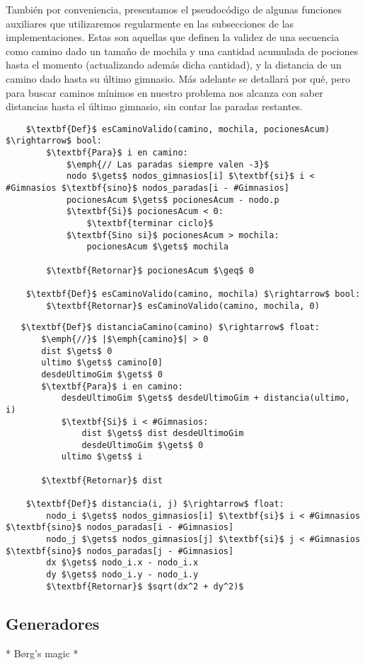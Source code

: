    También por conveniencia, presentamos el pseudocódigo de algunas funciones auxiliares que utilizaremos regularmente en las subsecciones de las implementaciones. Estas son aquellas que definen la validez de una secuencia como camino dado un tamaño de mochila y una cantidad acumulada de pociones hasta el momento (actualizando además dicha cantidad), y la distancia de un camino dado hasta su último gimnasio. Más adelante se detallará por qué, pero para buscar caminos mínimos en nuestro problema nos alcanza con saber distancias hasta el último gimnasio, sin contar las paradas restantes.
   \\

   \begin{lstlisting}
    $\textbf{Def}$ esCaminoValido(camino, mochila, pocionesAcum) $\rightarrow$ bool:
        $\textbf{Para}$ i en camino:
            $\emph{// Las paradas siempre valen -3}$
            nodo $\gets$ nodos_gimnasios[i] $\textbf{si}$ i < #Gimnasios $\textbf{sino}$ nodos_paradas[i - #Gimnasios]
            pocionesAcum $\gets$ pocionesAcum - nodo.p
            $\textbf{Si}$ pocionesAcum < 0:
                $\textbf{terminar ciclo}$
            $\textbf{Sino si}$ pocionesAcum > mochila:
                pocionesAcum $\gets$ mochila

        $\textbf{Retornar}$ pocionesAcum $\geq$ 0

    $\textbf{Def}$ esCaminoValido(camino, mochila) $\rightarrow$ bool:
        $\textbf{Retornar}$ esCaminoValido(camino, mochila, 0)
   \end{lstlisting}

   \begin{lstlisting}
   $\textbf{Def}$ distanciaCamino(camino) $\rightarrow$ float:
       $\emph{//}$ |$\emph{camino}$| > 0
       dist $\gets$ 0
       ultimo $\gets$ camino[0]
       desdeUltimoGim $\gets$ 0
       $\textbf{Para}$ i en camino:
           desdeUltimoGim $\gets$ desdeUltimoGim + distancia(ultimo, i)
           $\textbf{Si}$ i < #Gimnasios:
               dist $\gets$ dist desdeUltimoGim
               desdeUltimoGim $\gets$ 0
           ultimo $\gets$ i

       $\textbf{Retornar}$ dist

    $\textbf{Def}$ distancia(i, j) $\rightarrow$ float:
        nodo_i $\gets$ nodos_gimnasios[i] $\textbf{si}$ i < #Gimnasios $\textbf{sino}$ nodos_paradas[i - #Gimnasios]
        nodo_j $\gets$ nodos_gimnasios[j] $\textbf{si}$ j < #Gimnasios $\textbf{sino}$ nodos_paradas[j - #Gimnasios]
        dx $\gets$ nodo_i.x - nodo_i.x
        dy $\gets$ nodo_i.y - nodo_i.y
        $\textbf{Retornar}$ $sqrt(dx^2 + dy^2)$
   \end{lstlisting}




   \subsection{Generadores}
   {\color{red}* Børg's magic *}

